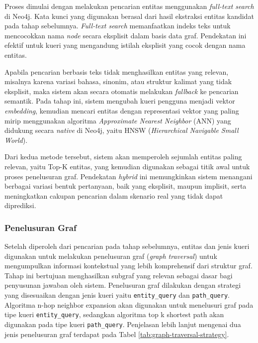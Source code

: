 Proses dimulai dengan melakukan pencarian entitas menggunakan \textit{full-text search} di Neo4j.
Kata kunci yang digunakan berasal dari hasil ekstraksi entitas kandidat pada tahap sebelumnya.
\textit{Full-text search} memanfaatkan indeks teks untuk mencocokkan nama \textit{node} secara eksplisit dalam basis data graf.
Pendekatan ini efektif untuk kueri yang mengandung istilah eksplisit yang cocok dengan nama entitas.

Apabila pencarian berbasis teks tidak menghasilkan entitas yang relevan, misalnya karena variasi bahasa, sinonim, atau struktur kalimat yang tidak eksplisit, maka sistem akan secara otomatis melakukan \textit{fallback} ke pencarian semantik.
Pada tahap ini, sistem mengubah kueri pengguna menjadi vektor \textit{embedding}, kemudian mencari entitas dengan representasi vektor yang paling mirip menggunakan algoritma \textit{Approximate Nearest Neighbor} (ANN) yang didukung secara \textit{native} di Neo4j, yaitu HNSW (\textit{Hierarchical Navigable Small World}).

Dari kedua metode tersebut, sistem akan memperoleh sejumlah entitas paling relevan, yaitu Top-K entitas, yang kemudian digunakan sebagai titik awal untuk proses penelusuran graf.
Pendekatan \textit{hybrid} ini memungkinkan sistem menangani berbagai variasi bentuk pertanyaan, baik yang eksplisit, maupun implisit, serta meningkatkan cakupan pencarian dalam skenario real yang tidak dapat diprediksi.

\subsubsection{Penelusuran Graf}
Setelah diperoleh dari pencarian pada tahap sebelumnya, entitas dan jenis kueri digunakan untuk melakukan penelusuran graf (\textit{graph traversal}) untuk mengumpulkan informasi kontekstual yang lebih komprehensif dari struktur graf.
Tahap ini bertujuan menghasilkan subgraf yang relevan sebagai dasar bagi penyusunan jawaban oleh sistem.
Penelusuran graf dilakukan dengan strategi yang disesuaikan dengan jenis kueri yaitu \texttt{entity\_query} dan \texttt{path\_query}.
Algoritma n-hop neighbor expansion akan digunakan untuk menelusuri graf pada tipe kueri \texttt{entity\_query}, sedangkan algoritma top k shortest path akan digunakan pada tipe kueri \texttt{path\_query}.
Penjelasan lebih lanjut mengenai dua jenis penelusuran graf terdapat pada Tabel \ref{tab:graph-traversal-strategy}.

